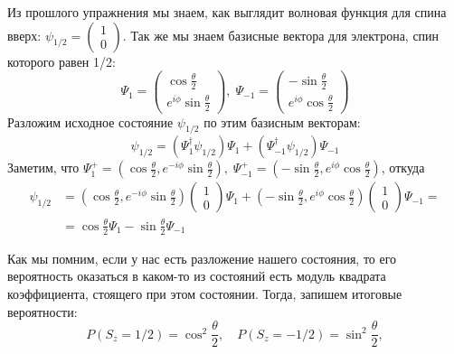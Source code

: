 Из прошлого упражнения мы знаем, как выглядит волновая функция для спина вверх: $\psi_{1/2} =\begin{pmatrix} 1 \\ 0 \end{pmatrix}$. Так же мы знаем базисные вектора для электрона, спин которого равен 1/2: 
\[
\Psi_1 = \begin{pmatrix}  \cos \frac{\theta}{2} \\ e^{i\phi} \sin\frac{\theta}{2}\end{pmatrix},\; \Psi_{-1} = \begin{pmatrix} -\sin\frac{\theta}{2} \\ e^{i\phi}\cos\frac{\theta}{2} \end{pmatrix}
\]
Разложим исходное состояние $\psi_{1/2}$ по этим базисным векторам:
\[
\psi_{1/2} = (\Psi_1^{\dagger}\psi_{1/2})\Psi_1 + (\Psi_{-1}^{\dagger}\psi_{1/2})\Psi_{-1}
\]
Заметим, что $\Psi_1^{+} = (\cos\frac{\theta}{2}, e^{-i\phi}\sin\frac{\theta}{2}), \; \Psi_{-1}^{+} = (-\sin\frac{\theta}{2}, e^{i\phi}\cos\frac{\theta}{2})$, откуда
\begin{align*}
    \psi_{1/2} &= (\cos\frac{\theta}{2}, e^{-i\phi}\sin\frac{\theta}{2}) \left(\begin{array}{c} 1 \\ 0 \end{array}\right)\Psi_1 + (-\sin\frac{\theta}{2}, e^{i\phi}\cos\frac{\theta}{2}) \left(\begin{array}{c}
    1 \\ 0 \end{array}\right)\Psi_{-1} = \\
    &= \cos\frac{\theta}{2}\Psi_1 - \sin\frac{\theta}{2}\Psi_{-1}
\end{align*}

Как мы помним, если у нас есть разложение нашего состояния, то его вероятность оказаться в каком-то из состояний есть модуль квадрата коэффициента, стоящего при этом состоянии. Тогда, запишем итоговые вероятности:
\[
    P(S_z = 1/2) = \cos^2\frac{\theta}{2},\quad P(S_z = -1/2) = \sin^2\frac{\theta}{2},
\]
